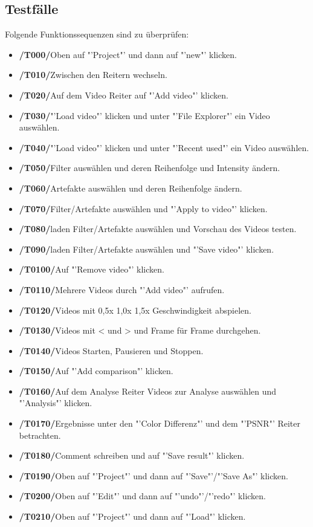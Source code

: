 \documentclass[parskip=full]{scrartcl}
\begin{document}
\subsection{Testfälle}
Folgende Funktionssequenzen sind zu überprüfen:
\begin{itemize}
\item[]\textbf{/T000/}\qquad Oben auf "'Project"' und dann auf "'new"' klicken.
\item[]\textbf{/T010/}\qquad Zwischen den Reitern wechseln.
\item[]\textbf{/T020/}\qquad Auf dem Video Reiter auf "'Add video"' klicken.
\item[]\textbf{/T030/}\qquad "'Load video"' klicken und unter "'File Explorer"' ein Video auswählen.
\item[]\textbf{/T040/}\qquad "'Load video"' klicken und unter "'Recent used"' ein Video auswählen.
\item[]\textbf{/T050/}\qquad Filter auswählen und deren Reihenfolge und Intensity ändern.
\item[]\textbf{/T060/}\qquad Artefakte auswählen und deren Reihenfolge  ändern.
\item[]\textbf{/T070/}\qquad Filter/Artefakte auswählen und "'Apply to video"' klicken.
\item[]\textbf{/T080/}\qquad laden Filter/Artefakte auswählen und Vorschau des Videos testen.
\item[]\textbf{/T090/}\qquad laden Filter/Artefakte auswählen und "'Save video"' klicken.
\item[]\textbf{/T0100/}\qquad Auf "'Remove video"' klicken.
\item[]\textbf{/T0110/}\qquad Mehrere Videos durch "'Add video"' aufrufen.
\item[]\textbf{/T0120/}\qquad Videos mit 0,5x 1,0x 1,5x Geschwindigkeit abspielen.
\item[]\textbf{/T0130/}\qquad Videos mit < und > und Frame für Frame  durchgehen.
\item[]\textbf{/T0140/}\qquad Videos Starten, Pausieren und Stoppen.
\item[]\textbf{/T0150/}\qquad Auf "'Add comparison"' klicken.
\item[]\textbf{/T0160/}\qquad Auf dem Analyse Reiter Videos zur Analyse auswählen und "'Analysis"' klicken.
\item[]\textbf{/T0170/}\qquad Ergebnisse unter den "'Color Differenz"' und dem "'PSNR"' Reiter betrachten.
\item[]\textbf{/T0180/}\qquad Comment schreiben und auf "'Save result"' klicken.
\item[]\textbf{/T0190/}\qquad Oben auf "'Project"' und dann auf "'Save"'/"'Save As"' klicken.
\item[]\textbf{/T0200/}\qquad Oben auf "'Edit"' und dann auf "'undo"'/"'redo"' klicken.
\item[]\textbf{/T0210/}\qquad Oben auf "'Project"' und dann auf "'Load"' klicken.
\end{itemize}
\end{document}
